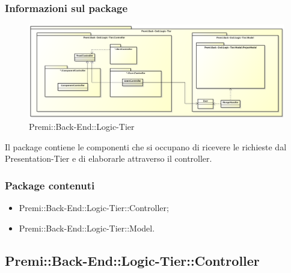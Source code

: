	\subsubsection*{Informazioni sul package}
	\begin{figure}[h]
		\centering
		\includegraphics[width=0.9\linewidth]{img/back-end_logic-tier_package}
		\caption[Premi::Back-End::Logic-Tier]{Premi::Back-End::Logic-Tier}
	\end{figure}
	Il package contiene le componenti che si occupano di ricevere le richieste dal Presentation-Tier e di elaborarle attraverso il controller.
	
	\subsubsection*{Package contenuti}
	\begin{itemize}
		\item Premi::Back-End::Logic-Tier::Controller;
		\item Premi::Back-End::Logic-Tier::Model.
	\end{itemize}

\newpage

\subsection{Premi::Back-End::Logic-Tier::Controller}
